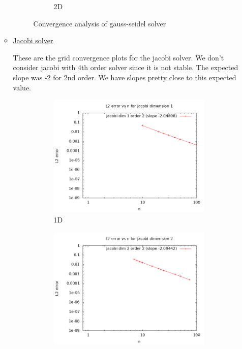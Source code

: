 \documentclass[12 pt, final]{article}
\begin{document}
\begin{itemize}
\begin{itemize}
\begin{figure}[H]
\begin{subfigure}{.5\textwidth}
          \caption{2D}
          \label{fig:sub2}
        \end{subfigure}
        \caption{Convergence analysis of gauss-seidel solver}
        \label{fig:test}
        \end{figure}

        \item \underline{Jacobi solver}
        
        These are the grid convergence plots for the jacobi solver. We don't consider jacobi with 4th order solver since it is not stable. The expected slope was -2 for 2nd order. We have slopes pretty close to this expected value.
        
        \begin{figure}[H]
        \centering
        \begin{subfigure}{.5\textwidth}
          \centering
          \includegraphics[width=.99\linewidth]{figures/convergence_jacobi_dim1.png}
          \caption{1D}
          \label{fig:sub1}
        \end{subfigure}%
        \begin{subfigure}{.5\textwidth}
          \centering
          \includegraphics[width=.99\linewidth]{figures/convergence_jacobi_dim2.png}

\end{subfigure}
\end{figure}
\end{itemize}
\end{itemize}
\end{document}
